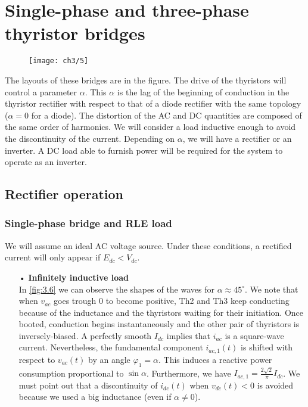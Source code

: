 				
	\section{Single-phase and three-phase thyristor bridges}
		\begin{wrapfigure}[11]{l}{9.7cm}
		\vspace{-5mm}
		\texttt{[image: ch3/5]}
		\end{wrapfigure}
		The layouts of these bridges are in the figure. The drive of the thyristors will control a parameter $\alpha$. This $\alpha$ is the lag of the beginning of conduction in the thyristor rectifier with respect to that of a diode rectifier with the same topology ($\alpha = 0$ for a diode). The distortion of the AC and DC quantities are composed of the same order of harmonics. We will consider a load inductive enough to avoid the discontinuity of the current.
		Depending on $\alpha$, we will have a rectifier or an inverter. A DC load able to furnish power will be required for the system to operate as an inverter. 
		
			\subsection{Rectifier operation}
				\subsubsection{Single-phase bridge and RLE load}
					We will assume an ideal AC voltage source. Under these conditions, a rectified current will only appear if $E_{dc} < V_{dc}$. \\
					
					\begin{itemize}
					\item[•] \textbf{Infinitely inductive load}\\
					In \autoref{fig:3.6} we can observe the shapes of the waves for $\alpha \approx 45^{\circ}$. We note that when $v_{ac}$ goes trough 0 to become positive, Th2 and Th3 keep conducting because of the inductance and the thyristors waiting for their initiation. Once booted, conduction begins instantaneously and the other pair of thyristors is inversely-biased. A perfectly smooth $I_{dc}$ implies that $i_{ac}$ is a square-wave current. Nevertheless, the fundamental component $i_{ac,1}(t)$ is shifted with respect to $v_{ac}(t)$  by an angle $\varphi _1 = \alpha$. This induces a reactive power consumption proportional to $\sin \alpha$. Furthermore, we have $I_{ac,1} = \frac{2\sqrt{2}}{\pi}I_{dc}$. We must point out that a discontinuity of $i_{dc}(t)$ when $v_{dc}(t)<0$ is avoided because we used a big inductance (even if $\alpha \neq 0$). 
					\end{itemize}
					
